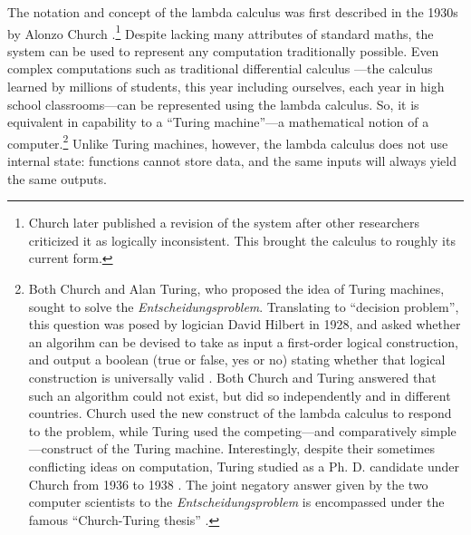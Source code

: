 \documentclass[twocolumn,titlepage,12pt]{article}
\begin{document}
The notation and concept of the lambda calculus was first described in the 1930s by Alonzo Church \cite{church}.\footnote{Church later published a revision \cite{church2} of the system after other researchers\cite{logicallyinconsistent} criticized it as logically inconsistent. This brought the calculus to roughly its current form.} Despite lacking many attributes of standard maths, the system can be used to represent any computation traditionally possible. Even complex computations such as traditional differential calculus \cite{differentiallc}---the calculus learned by millions of students, this year including ourselves, each year in high school classrooms---can be represented using the lambda calculus. So, it is equivalent in capability to a ``Turing machine''---a mathematical notion of a computer.\footnote{Both Church and Alan Turing, who proposed the idea of Turing machines, sought to solve the \textit{Entscheidungsproblem}. Translating to ``decision problem'', this question was posed by logician David Hilbert in 1928, and asked whether an algorihm can be devised to take as input a first-order logical construction, and output a boolean (true or false, yes or no) stating whether that logical construction is universally valid \cite{hilbert}. Both Church and Turing answered that such an algorithm could not exist, but did so independently and in different countries. Church used the new construct of the lambda calculus to respond to the problem, while Turing used the competing---and comparatively simple---construct of the Turing machine. Interestingly, despite their sometimes conflicting ideas on computation, Turing studied as a Ph. D. candidate under Church from 1936 to 1938 \cite{churchpapers}. The joint negatory answer given by the two computer scientists to the \textit{Entscheidungsproblem} is encompassed under the famous ``Church-Turing thesis'' \cite{churchturingthesis}.} Unlike Turing machines, however, the lambda calculus does not use internal state: functions cannot store data, and the same inputs will always yield the same outputs.
\end{document}
